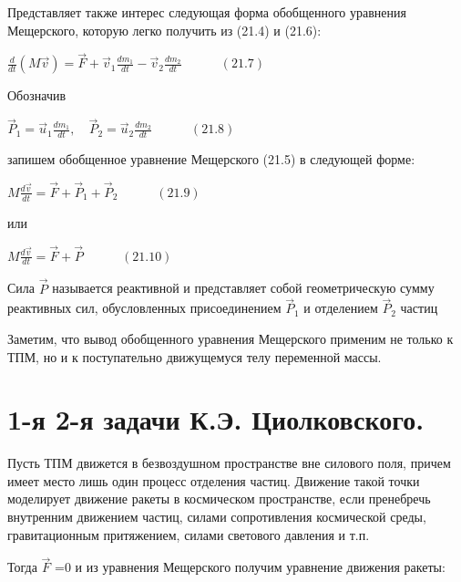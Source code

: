 {\begin{center}
\par Представляет также интерес следующая форма обобщенного уравнения Мещерского, которую легко получить из (21.4) и (21.6):

\par $\frac{d}{dt}(M \vec{v}) = \vec{F} + \vec{v}_1 \frac{dm_1}{dt} - \vec{v}_2 \frac{dm_2}{dt} \quad\quad\quad (21.7)$

\par Обозначив

\par $\vec{P}_1 = \vec{u}_1 \frac{dm_1}{dt}, \quad \vec{P}_2 = \vec{u}_2 \frac{dm_2}{dt} \quad\quad\quad (21.8)$

\par запишем обобщенное уравнение Мещерского (21.5) в следующей форме:

\par $M \frac{d\vec{v}}{dt} = \vec{F} + \vec{P}_1 + \vec{P}_2 \quad\quad\quad (21.9)$

\par или

\par $M \frac{d\vec{v}}{dt} = \vec{F} + \vec{P} \quad\quad\quad (21.10)$ 

\par Сила $\vec{P}$ называется  реактивной  и  представляет  собой  геометрическую сумму реактивных сил, обусловленных присоединением $\vec{P}_1$ и отделением  $\vec{P}_2$ частиц

\par Заметим, что вывод обобщенного уравнения Мещерского применим не только к ТПМ, но и к поступательно движущемуся телу переменной массы.

\end{center}
\section{1-я 2-я задачи К.Э. Циолковского.}
\begin{center}
    \par Пусть ТПМ движется в безвоздушном пространстве вне силового поля, причем имеет место лишь один процесс отделения частиц. Движение такой точки моделирует движение ракеты в космическом пространстве, если пренебречь внутренним движением частиц, силами сопротивления космической среды, гравитационным притяжением, силами светового давления и т.п.
    
    \par Тогда $\vec{F}$ =0  и из уравнения Мещерского получим уравнение движения ракеты:


\end{center}}
